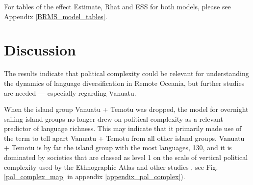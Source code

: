 \documentclass[unnumsec,webpdf,modern,medium]{oup-authoring-template}
\begin{document}
For tables of the effect Estimate, Rhat and ESS for both models, please see Appendix \ref{BRMS_model_tables}.









\FloatBarrier
\section{Discussion}
\label{pol_study_discisson}
The results indicate that political complexity could be relevant for understanding the dynamics of language diversification in Remote Oceania, but further studies are needed --- especially regarding Vanuatu. 

When the island group Vanuatu + Temotu was dropped, the model for overnight sailing island groups no longer drew on political complexity as a relevant predictor of language richness. This may indicate that it primarily made use of the term to tell apart Vanuatu + Temotu from all other island groups. Vanuatu + Temotu is by far the island group with the most languages, 130, and it is dominated by societies that are classed as level 1 on the scale of vertical political complexity used by the Ethnographic Atlas \citep{gray1998ethnographic} and other studies \citep{watts_2018}, see Fig. \ref{pol_complex_map} in appendix \ref{appendix_pol_complex}).
\end{document}
